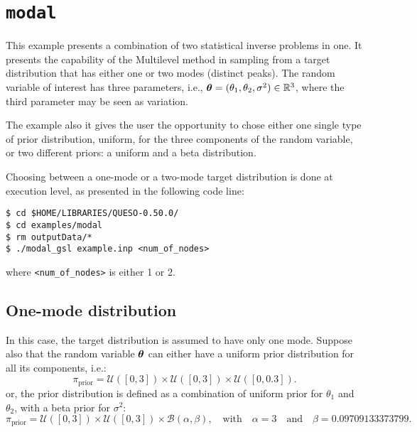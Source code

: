 \section{\texttt{modal}}\label{sec:example_modal}


This example presents a combination of two statistical inverse problems in one. 
It presents the capability of the Multilevel method in sampling from a target distribution that has either one or two modes (distinct peaks). The random variable of interest has three parameters, i.e., $\mbox{\boldmath$ \theta $}=(\theta_1,\theta_2, \sigma^2) \in \mathbb{R}^3$, where the third parameter may be seen as variation.

The example also it gives the user the opportunity to chose either one single type of prior distribution, uniform, for the three components of the random variable, or two different priors: a uniform and a beta distribution.

Choosing between a one-mode or a two-mode target distribution is done at execution level, as presented in the following code line:

\begin{lstlisting}[label={},caption={}]
$ cd $HOME/LIBRARIES/QUESO-0.50.0/
$ cd examples/modal
$ rm outputData/*
$ ./modal_gsl example.inp <num_of_nodes>
\end{lstlisting}
where \verb+<num_of_nodes>+ is either 1 or 2.
% 
% 
% 
% 
% 
% 
% 
% 
\subsection{One-mode distribution}

In this case, the target distribution is assumed to have only one mode.
Suppose also that the random variable $\mbox{\boldmath$ \theta $}$  can either have a uniform prior distribution for all its components, i.e.:
$$
\pi_{\text{prior}}=\mathcal{U}([0,3]) \times \mathcal{U}([0,3]) \times \mathcal{U}([0,0.3]).
$$
or, the prior distribution is defined as a combination of uniform prior for $\theta_1$ and $\theta_2$, with a beta prior for $\sigma^2$:
$$
\pi_{\text{prior}}=\mathcal{U}([0,3]) \times \mathcal{U}([0,3]) \times \mathcal{B}(\alpha,\beta), \quad \text{with} \quad \alpha=3 \quad\text{and}\quad \beta=0.09709133373799.
$$

